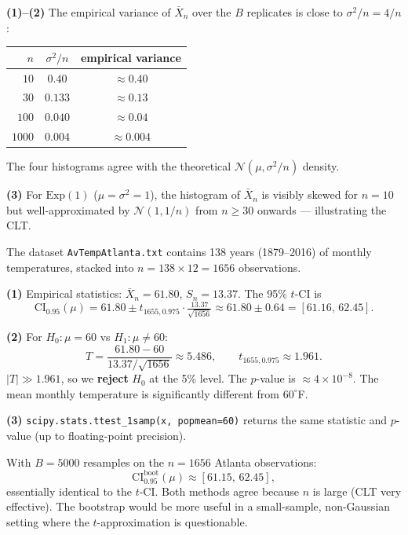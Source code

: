 \documentclass[a4paper,11pt]{article}
\begin{document}
\begin{solution}
\textbf{(1)--(2)} The empirical variance of $\bar X_n$ over the $B$
replicates is close to $\sigma^2 / n = 4/n$:

\noindent
\begin{tabular}{rcc}
\toprule
$n$ & $\sigma^2/n$ & empirical variance \\
\midrule
$10$   & $0.40$   & $\approx 0.40$ \\
$30$   & $0.133$  & $\approx 0.13$ \\
$100$  & $0.040$  & $\approx 0.04$ \\
$1000$ & $0.004$  & $\approx 0.004$ \\
\bottomrule
\end{tabular}

\medskip
The four histograms agree with the theoretical $\mathcal{N}(\mu,
\sigma^2/n)$ density.

\textbf{(3)} For $\mathrm{Exp}(1)$ ($\mu = \sigma^2 = 1$), the histogram
of $\bar X_n$ is visibly skewed for $n = 10$ but well-approximated by
$\mathcal{N}(1, 1/n)$ from $n \geq 30$ onwards — illustrating the CLT.
\end{solution}

\begin{exercise}\end{exercise}

\begin{solution}
The dataset \texttt{AvTempAtlanta.txt} contains 138 years (1879--2016)
of monthly temperatures, stacked into $n = 138 \times 12 = 1656$
observations.

\textbf{(1)} Empirical statistics: $\bar X_n = 61.80$, $S_n = 13.37$.
The 95\% $t$-CI is
\[
  \mathrm{CI}_{0.95}(\mu)
  = 61.80 \pm t_{1655, 0.975} \cdot \tfrac{13.37}{\sqrt{1656}}
  \approx 61.80 \pm 0.64
  = [61.16,\, 62.45].
\]

\textbf{(2)} For $H_0 : \mu = 60$ vs $H_1 : \mu \neq 60$:
\[
  T = \frac{61.80 - 60}{13.37 / \sqrt{1656}} \approx 5.486,
  \qquad
  t_{1655, 0.975} \approx 1.961.
\]
$|T| \gg 1.961$, so we \textbf{reject} $H_0$ at the 5\% level. The
$p$-value is $\approx 4 \times 10^{-8}$. The mean monthly temperature is
significantly different from $60^\circ$F.

\textbf{(3)} \texttt{scipy.stats.ttest\_1samp(x, popmean=60)} returns
the same statistic and $p$-value (up to floating-point precision).
\end{solution}

\begin{exercise}\end{exercise}

\begin{solution}
With $B = 5000$ resamples on the $n = 1656$ Atlanta observations:
\[
  \mathrm{CI}_{0.95}^{\text{boot}}(\mu) \approx [61.15,\, 62.45],
\]
essentially identical to the $t$-CI. Both methods agree because $n$ is
large (CLT very effective). The bootstrap would be more useful in a
small-sample, non-Gaussian setting where the $t$-approximation is
questionable.
\end{solution}
\end{document}

